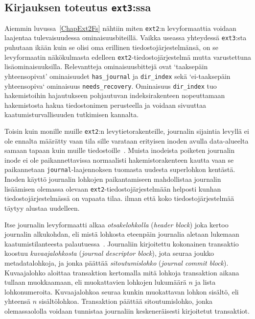 %

\subsection{Kirjauksen toteutus \texttt{ext3}:ssa}
Aiemmin luvussa~\ref{ChapExt2Fs} nähtiin miten \texttt{ext2}:n levyformaattia voidaan laajentaa tulevaisuudessa ominaisuusbiteillä.
Vaikka useassa yhteydessä \texttt{ext3}:sta puhutaan ikään kuin se olisi oma erillinen tiedostojärjestelmänsä,
on se levyformaatin näkökulmasta edelleen \texttt{ext2}-tiedostojärjestelmä mutta varustettuna lisäominaisuuksilla.
Relevantteja ominaisuusbittejä ovat `taaksepäin yhteensopivat' ominaisuudet \texttt{has\_journal} ja \texttt{dir\_index} sekä `ei-taaksepäin yhteensopiva` ominaisuus \texttt{needs\_recovery}.
Ominaisuus \texttt{dir\_index} tuo hakemistoihin hajautukseen pohjautuvan indeksirakenteen nopeuttamaan hakemistosta hakua tiedostonimen perusteella ja voidaan sivuuttaa kaatumisturvallisuuden tutkimisen kannalta.

Toisin kuin monille muille \texttt{ext2}:n levytietorakenteille, journalin sijaintia levyllä ei ole ennalta määrätty vaan tila sille varataan erityisen inoden avulla data-alueelta samaan tapaan kuin muille tiedostoille~\cite{Ext2Journal}.
Muista inodeista poiketen journalin inode ei ole paikannettavissa normaalisti hakemistorakenteen kautta vaan se paikannetaan \texttt{journal}-laajennoksen tuomasta uudesta superlohkon kentästä.
Inoden käyttö journalin lohkojen paikantamiseen mahdollistaa journalin lisäämisen olemassa olevaan \texttt{ext2}-tiedostojärjestelmään helposti kunhan tiedostojärjestelmässä on vapaata tilaa.
ilman että koko tiedostojärjestelmää täytyy alustaa uudelleen.

Itse journalin levyformaatti alkaa \emph{otsakelohkolla} (\emph{header block}) joka kertoo journalin alkukohdan,
eli mistä lohkosta eteenpäin journalia aletaan lukemaan kaatumistilanteesta palautuessa~\cite{JournalingAnalysis}.
Journaliin kirjoitettu kokonainen transaktio koostuu \emph{kuvaajalohkosta} (\emph{journal descriptor block}),
jota seuraa joukko metadatalohkoja,
ja jonka päättää \emph{sitoutumislohko} (\emph{journal commit block}).
Kuvaajalohko aloittaa transaktion kertomalla mitä lohkoja transaktion aikana tullaan muokkaamaan,
eli muokattavien lohkojen lukumäärä $n$ ja lista lohkonumeroita.
Kuvaajalohkoa seuraa kunkin muokattavan lohkon sisältö, eli yhteensä $n$ sisältölohkoa.
Transaktion päättää sitoutumislohko,
jonka olemassaololla voidaan tunnistaa journaliin keskeneräisesti kirjoitetut transaktiot.

